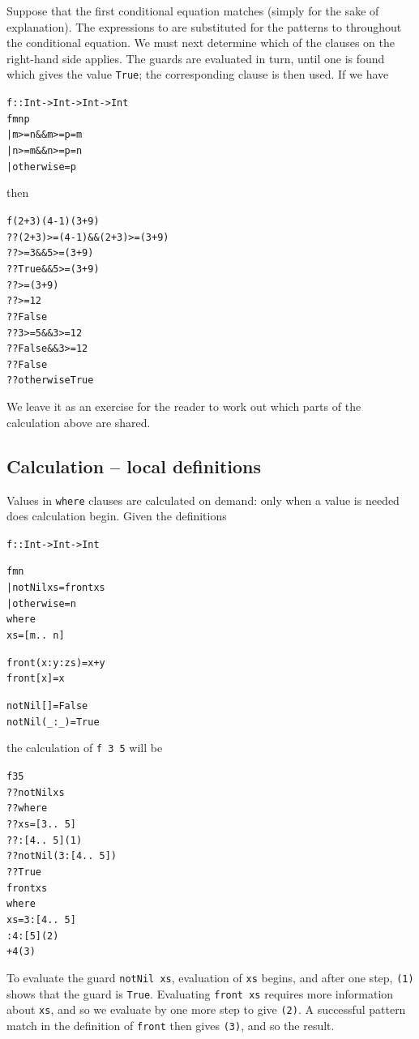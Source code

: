 Suppose that the first conditional equation matches (simply for the sake of
explanation). The expressions
\texttt{} to \texttt{} are 
substituted for the patterns  \texttt{} to \texttt{}
throughout the conditional equation. We must next
determine which of the clauses on the right-hand side applies. The guards
are evaluated in turn, until one is found which gives the value 
\texttt{True}; the corresponding clause is then used. If we have
\begin{alltt}
f :: Int -> Int -> Int -> Int
f m n p
  | m>=n \&\& m>=p        = m
  | n>=m \&\& n>=p        = n
  | otherwise           = p
\end{alltt}
then
\begin{alltt}
f (2+3) (4-1) (3+9)
  ??  (2+3)>=(4-1) \&\& (2+3)>=(3+9)
  ??    >=3 \&\& 5>=(3+9)
  ??    \step True \&\& 5>=(3+9) 
  ??    >=(3+9)
  ??    >=12
  ??    \step False
  ??  3>=5 \&\& 3>=12
  ??    \step False \&\& 3>=12
  ??    \step False
  ??  otherwise \step True
\end{alltt}
We leave it as an exercise for the reader to work out which parts of the
calculation above are shared.

\subsection*{Calculation -- local definitions}

Values in \texttt{where} clauses are calculated on demand: only
when a value is needed does calculation begin. Given the definitions
\begin{alltt}
f :: Int -> Int -> Int

f m n
  | notNil xs    = front xs
  | otherwise    = n
    where
    xs = [m ..\ n]

front (x:y:zs) = x+y
front [x]      = x

notNil []    = False
notNil (_:_) = True
\end{alltt}
the calculation of \texttt{f 3 5} will be
\begin{alltt}
f 3 5
  ?? notNil xs
  ??     where 
  ??     xs = [3 ..\ 5]
  ??\vertline{30pt}       :[4 ..\ 5] \hfill (1)
  ?? \step notNil (3:[4 ..\ 5])
  ?? \step True
\step front xs
       where
       xs = 3:[4 ..\ 5]
\vertline{30pt}          :4:[5] \hfill (2)
+4\hfill (3)
\end{alltt}
To evaluate the guard \texttt{notNil xs}, evaluation of \texttt{xs} begins, and after
one step, \texttt{(1)} shows that the guard is \texttt{True}. Evaluating \texttt{front
xs} requires more information about \texttt{xs}, and so we evaluate by one more
step to give \texttt{(2)}. A successful pattern match in the definition of 
\texttt{front} then gives \texttt{(3)}, and so the result.

